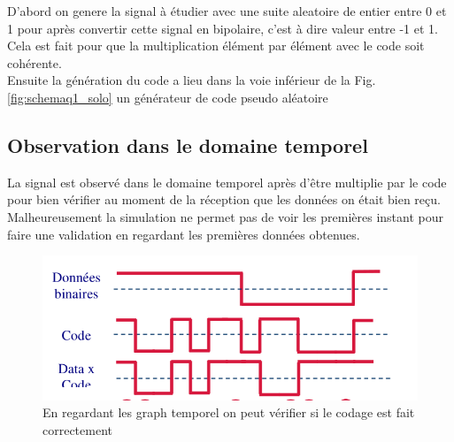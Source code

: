 \documentclass{report}
\begin{document}
D'abord on genere la signal à étudier avec une suite aleatoire de entier entre 0 et 1 pour après 
convertir cette signal en bipolaire, c'est à dire valeur entre -1 et 1. Cela est
fait pour que la multiplication élément par élément avec le code soit cohérente.\\%

Ensuite la génération du code a lieu dans la voie inférieur de la Fig.\ref{fig:schemaq1_solo}
un générateur de code pseudo aléatoire %
%
%
%
%



\subsection{Observation dans le domaine temporel}

La signal est observé dans le domaine temporel après d'être multiplie par le code pour bien vérifier au moment 
de la réception que les données on était bien reçu. Malheureusement la simulation ne permet pas de voir les premières
instant pour faire une validation en regardant les premières données obtenues.

\begin{figure}[h]
	\centering
	\includegraphics[width=0.5\linewidth]{error_rojo}
	\caption{En regardant les graph temporel on peut vérifier si le codage est fait correctement}
	\label{fig:errorrojo}
\end{figure}
\end{document}
